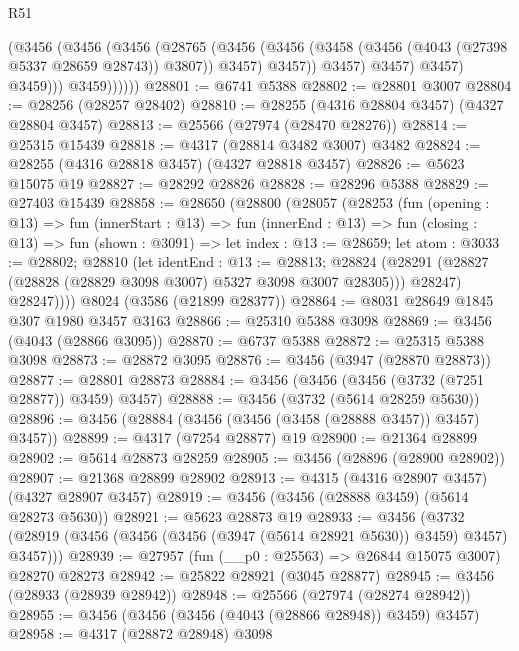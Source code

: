 \begin{lexlean}{R51}
\begin{coremodule}
                      (@3456
                        (@3456
                          (@3456
                            (@28765
                              (@3456
                                (@3456
                                  (@3458 (@3456 (@4043 (@27398 @5337 @28659 @28743)) @3807))
                                  @3457)
                                @3457))
                            @3457)
                          @3457)
                        @3457)
                      @3459)))
                @3459))))))
@28801 := @6741 @5388
@28802 := @28801 @3007
@28804 := @28256 (@28257 @28402)
@28810 := @28255 (@4316 @28804 @3457) (@4327 @28804 @3457)
@28813 := @25566 (@27974 (@28470 @28276))
@28814 := @25315 @15439
@28818 := @4317 (@28814 @3482 @3007) @3482
@28824 := @28255 (@4316 @28818 @3457) (@4327 @28818 @3457)
@28826 := @5623 @15075 @19
@28827 := @28292 @28826
@28828 := @28296 @5388
@28829 := @27403 @15439
@28858 := @28650
    (@28800
      (@28057
        (@28253
          (fun (opening : @13) =>
          fun (innerStart : @13) =>
          fun (innerEnd : @13) =>
          fun (closing : @13) =>
          fun (shown : @3091) =>
          let index : @13 := @28659;
          let atom : @3033 := @28802;
          @28810
            (let identEnd : @13 := @28813;
            @28824 (@28291 (@28827 (@28828 (@28829 @3098 @3007) @5327 @3098 @3007 @28305))) @28247)
            @28247))))
    @8024
    (@3586 (@21899 @28377))
@28864 := @8031 @28649 @1845 @307 @1980 @3457 @3163
@28866 := @25310 @5388 @3098
@28869 := @3456 (@4043 (@28866 @3095))
@28870 := @6737 @5388
@28872 := @25315 @5388 @3098
@28873 := @28872 @3095
@28876 := @3456 (@3947 (@28870 @28873))
@28877 := @28801 @28873
@28884 := @3456 (@3456 (@3456 (@3732 (@7251 @28877)) @3459) @3457)
@28888 := @3456 (@3732 (@5614 @28259 @5630))
@28896 := @3456 (@28884 (@3456 (@3456 (@3458 (@28888 @3457)) @3457) @3457))
@28899 := @4317 (@7254 @28877) @19
@28900 := @21364 @28899
@28902 := @5614 @28873 @28259
@28905 := @3456 (@28896 (@28900 @28902))
@28907 := @21368 @28899 @28902
@28913 := @4315 (@4316 @28907 @3457) (@4327 @28907 @3457)
@28919 := @3456 (@3456 (@28888 @3459) (@5614 @28273 @5630))
@28921 := @5623 @28873 @19
@28933 := @3456
    (@3732 (@28919 (@3456 (@3456 (@3456 (@3947 (@5614 @28921 @5630)) @3459) @3457) @3457)))
@28939 := @27957 (fun (__p0 : @25563) => @26844 @15075 @3007) @28270 @28273
@28942 := @25822 @28921 (@3045 @28877)
@28945 := @3456 (@28933 (@28939 @28942))
@28948 := @25566 (@27974 (@28274 @28942))
@28955 := @3456 (@3456 (@3456 (@4043 (@28866 @28948)) @3459) @3457)
@28958 := @4317 (@28872 @28948) @3098

\end{coremodule}
\end{lexlean}
